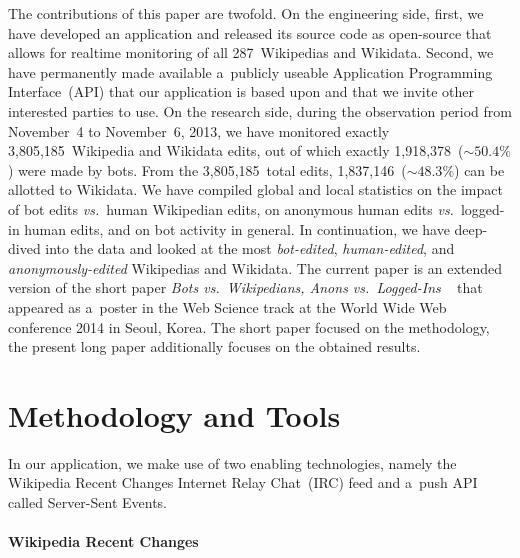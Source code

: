 \documentclass{sig-alternate}
\begin{document}
The contributions of this paper are twofold.
On the engineering side, first, we have developed an application
and released its source code as open-source
that allows for realtime monitoring of all 287~Wikipedias and Wikidata.
Second, we have permanently made available a~publicly useable
Application Programming Interface~(API) that our application
is based upon and that we invite other interested parties to use.
On the research side, during the observation period
from November~4 to November~6, 2013,
we have monitored exactly
3,805,185~Wikipedia and Wikidata edits, 
out of which exactly 1,918,378~($\sim50.4\%$) were made by bots.
From the 3,805,185~total edits,
1,837,146~($\sim48.3\%$) can be allotted to Wikidata.
We have compiled global and local statistics on the impact of
bot edits \emph{vs.}\ human Wikipedian edits,
on anonymous human edits \emph{vs.}\ logged-in human edits,
and on bot activity in general.
In continuation, we have deep-dived into the data
and looked at the most \emph{bot-edited}, \emph{human-edited},
and \emph{anonymously-edited} Wikipedias and Wikidata.
The current paper is an extended version of the short paper
\textit{Bots vs.\ Wikipedians, Anons vs.\ Logged-Ins}%
~\cite{steiner2014botsvswikipedians} that appeared
as a~poster in the Web Science track at the World Wide Web 
conference 2014 in Seoul, Korea.
The short paper focused on the methodology,
the present long paper additionally focuses
on the obtained results.

\section{Methodology and Tools}

In our application, we make use of two enabling technologies,
namely the Wikipedia Recent Changes Internet Relay Chat~(IRC) feed
and a~push API called Server-Sent Events.

\paragraph{Wikipedia Recent Changes}
\label{sec:wikipedia-recent-changes}
\end{document}
